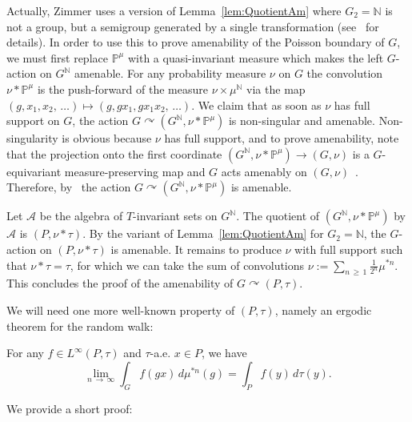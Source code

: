 \documentclass[AHL,Unicode,longabstracts,published]{cedram}
\newcommand{\bbN}{\mathbb{N}}
\newcommand{\bbP}{\mathbb{P}}
\newcommand{\calA}{\mathcal{A}}
\begin{document}
Actually, Zimmer uses a version of Lemma~\ref{lem:QuotientAm} where $G_2=\bbN$ is not a group, but a semigroup generated by a single transformation (see~\cite[Section~5]{Zimmer78} for details). In order to use this to prove amenability of the Poisson boundary of $G$, we must first replace $\bbP^\mu$ with a quasi-invariant measure which makes the left $G$-action on $G^\bbN$ amenable. For any probability measure $\nu$ on $G$ the convolution $\nu*\bbP^\mu$ is the push-forward of the measure $\nu\times \mu^\bbN$ via the map $(g,x_1,x_2,\,\ldots)\mapsto (g,gx_1,gx_1x_2,\,\ldots).$ We claim that as soon as $\nu$ has full support on $G$, the action $G\curvearrowright (G^\bbN,\nu*\bbP^\mu)$ is non-singular and amenable. Non-singularity is obvious because $\nu$ has full support, and to prove amenability, note that the projection onto the first coordinate $(G^\bbN,\nu*\bbP^\mu)\to (G,\nu)$ is a $G$-equivariant measure-preserving map and $G$ acts amenably on $(G,\nu)$~\cite[4.3.2]{Zimmer}. Therefore, by~\cite[Theorem~2.4]{Zimmer78} the action $G\curvearrowright (G^\bbN, \nu*\bbP^\mu)$ is amenable.

Let $\calA$ be the algebra of $T$-invariant sets on $G^\bbN$. The quotient of $(G^\bbN,\nu*\bbP^\mu)$ by $\calA$ is $(P,\nu*\tau)$. By the variant of Lemma~\ref{lem:QuotientAm} for $G_2=\bbN$, the $G$-action on $(P,\nu*\tau)$ is amenable. It remains to produce $\nu$ with full support such that $\nu*\tau=\tau$, for which we can take the sum of convolutions $\nu:=\sum_{n\,\geq\,1} \frac{1}{2^n} \mu^{\ast n}$. This concludes the proof of the amenability of $G\curvearrowright(P,\tau)$.

We will need one more well-known property of $(P,\tau)$, namely an ergodic theorem for the random walk:

\begin{lemm}\label{lem:ConvConv}
For any $f\in L^\infty(P,\tau)$ and $\tau$-a.e. $x\in P$, we have 
\[
\lim_{n\,\to\,\infty} \int_G f(gx)\, d\mu^{\ast n}(g)=\int_P f(y) \, d\tau(y).
\]
\end{lemm}

We provide a short proof:
\end{document}

